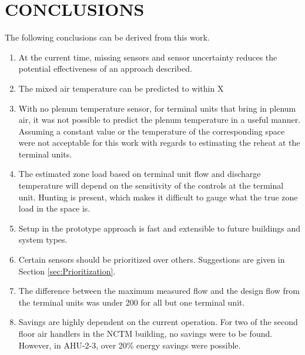 \chapter{\uppercase{Conclusions}} 

The following conclusions can be derived from this work.

\begin{enumerate}
    \item At the current time, missing sensors and sensor uncertainty 
        reduces the potential effectiveness of an approach described.
    \item The mixed air temperature can be predicted to within X
    \item With no plenum temperature sensor, for terminal units that
        bring in plenum air, it was not possible to predict the plenum
        temperature in a useful manner. Assuming a constant value or the
        temperature of the corresponding space were not acceptable for
        this work with regards to estimating the reheat at the terminal units.
    \item The estimated zone load based on terminal unit flow and
        discharge temperature will depend on the sensitivity of the
        controls at the terminal unit. Hunting is present, which makes
        it difficult to gauge what the true zone load in the space is. 
    \item Setup in the prototype approach is fast and extensible to
        future buildings and system types. 
    \item Certain sensors should be prioritized over others. Suggestions
        are given in Section \ref{sec:Prioritization}. 
    \item The difference between the maximum measured flow and the design flow
        from the terminal units was under \SI{200}{\CFM} for all but one
        terminal unit. 
    \item Savings are highly dependent on the current operation. For two
        of the second floor air handlers in the NCTM building, no
        savings were to be found. However, in AHU-2-3, over 20\% energy
        savings were possible. 
\end{enumerate}
